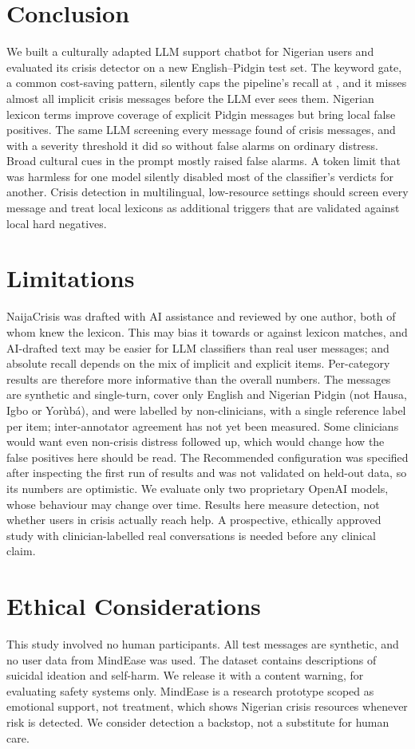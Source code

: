 \section{Conclusion}
We built a culturally adapted LLM support chatbot for Nigerian users and evaluated its crisis detector on a new English--Pidgin test set. The keyword gate, a common cost-saving pattern, silently caps the pipeline's recall at \KWfullR, and it misses almost all implicit crisis messages before the LLM ever sees them. Nigerian lexicon terms improve coverage of explicit Pidgin messages but bring local false positives. The same LLM screening every message found  of crisis messages, and with a severity threshold it did so without false alarms on ordinary distress. Broad cultural cues in the prompt mostly raised false alarms. A token limit that was harmless for one model silently disabled most of the classifier's verdicts for another. Crisis detection in multilingual, low-resource settings should screen every message and treat local lexicons as additional triggers that are validated against local hard negatives.

\section*{Limitations}
NaijaCrisis was drafted with AI assistance and reviewed by one author, both of whom knew the lexicon. This may bias it towards or against lexicon matches, and AI-drafted text may be easier for LLM classifiers than real user messages; and absolute recall depends on the mix of implicit and explicit items. Per-category results are therefore more informative than the overall numbers. The messages are synthetic and single-turn, cover only English and Nigerian Pidgin (not Hausa, Igbo or Yor\`ub\'a), and were labelled by non-clinicians, with a single reference label per item; inter-annotator agreement has not yet been measured. Some clinicians would want even non-crisis distress followed up, which would change how the false positives here should be read. The Recommended configuration was specified after inspecting the first run of results and was not validated on held-out data, so its numbers are optimistic. We evaluate only two proprietary OpenAI models, whose behaviour may change over time. Results here measure detection, not whether users in crisis actually reach help. A prospective, ethically approved study with clinician-labelled real conversations is needed before any clinical claim.

\section*{Ethical Considerations}
This study involved no human participants. All test messages are synthetic, and no user data from MindEase was used. The dataset contains descriptions of suicidal ideation and self-harm. We release it with a content warning, for evaluating safety systems only. MindEase is a research prototype scoped as emotional support, not treatment, which shows Nigerian crisis resources whenever risk is detected. We consider detection a backstop, not a substitute for human care.

